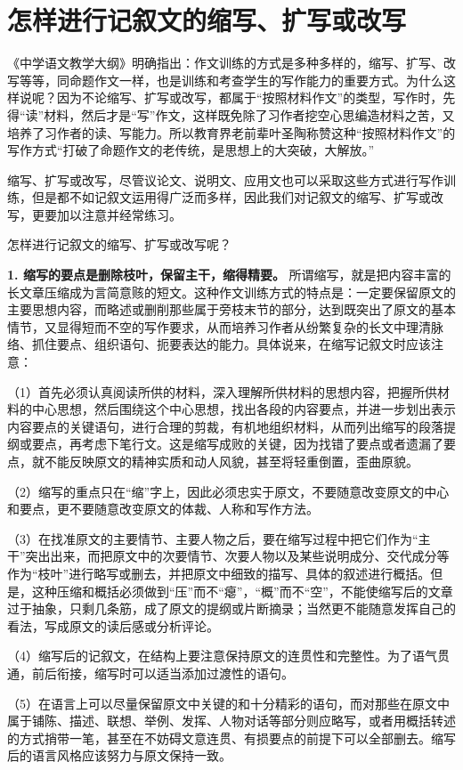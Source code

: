 \section{怎样进行记叙文的缩写、扩写或改写}

《中学语文教学大纲》明确指出：作文训练的方式是多种多样的，缩写、扩写、改写等等，同命题作文一样，也是训练和考查学生的写作能力的重要方式。为什么这样说呢？因为不论缩写、扩写或改写，都属于“按照材料作文”的类型，写作时，先得“读”材料，然后才是“写”作文，这样既免除了习作者挖空心思编造材料之苦，又培养了习作者的读、写能力。所以教育界老前辈叶圣陶称赞这种“按照材料作文”的写作方式“打破了命题作文的老传统，是思想上的大突破，大解放。”

缩写、扩写或改写，尽管议论文、说明文、应用文也可以采取这些方式进行写作训练，但是都不如记叙文运用得广泛而多样，因此我们对记叙文的缩写、扩写或改写，更要加以注意并经常练习。

怎样进行记叙文的缩写、扩写或改写呢？

\textbf{1. 缩写的要点是删除枝叶，保留主干，缩得精要。}
所谓缩写，就是把内容丰富的长文章压缩成为言简意赅的短文。这种作文训练方式的特点是：一定要保留原文的主要思想内容，而略述或删削那些属于旁枝末节的部分，达到既突出了原文的基本情节，又显得短而不空的写作要求，从而培养习作者从纷繁复杂的长文中理清脉络、抓住要点、组织语句、扼要表达的能力。具体说来，在缩写记叙文时应该注意：

（1）首先必须认真阅读所供的材料，深入理解所供材料的思想内容，把握所供材料的中心思想，然后围绕这个中心思想，找出各段的内容要点，并进一步划出表示内容要点的关键语句，进行合理的剪裁，有机地组织材料，从而列出缩写的段落提纲或要点，再考虑下笔行文。这是缩写成败的关键，因为找错了要点或者遗漏了要点，就不能反映原文的精神实质和动人风貌，甚至将轻重倒置，歪曲原貌。

（2）缩写的重点只在“缩”字上，因此必须忠实于原文，不要随意改变原文的中心和要点，更不要随意改变原文的体裁、人称和写作方法。

（3）在找准原文的主要情节、主要人物之后，要在缩写过程中把它们作为“主干”突出出来，而把原文中的次要情节、次要人物以及某些说明成分、交代成分等作为“枝叶”进行略写或删去，并把原文中细致的描写、具体的叙述进行概括。但是，这种压缩和概括必须做到“压”而不“瘪”，“概”而不“空”，不能使缩写后的文章过于抽象，只剩几条筋，成了原文的提纲或片断摘录；当然更不能随意发挥自己的看法，写成原文的读后感或分析评论。

（4）缩写后的记叙文，在结构上要注意保持原文的连贯性和完整性。为了语气贯通，前后衔接，缩写时可以适当添加过渡性的语句。

（5）在语言上可以尽量保留原文中关键的和十分精彩的语句，而对那些在原文中属于铺陈、描述、联想、举例、发挥、人物对话等部分则应略写，或者用概括转述的方式捎带一笔，甚至在不妨碍文意连贯、有损要点的前提下可以全部删去。缩写后的语言风格应该努力与原文保持一致。


